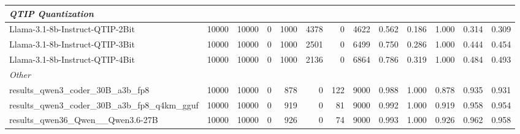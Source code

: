 \begin{table}[htbp]
{\begin{tabular}{lrrrrrrrrrrrr}
    \midrule
    \multicolumn{13}{l}{\textit{QTIP Quantization}} \\
    \midrule
    Llama-3.1-8b-Instruct-QTIP-2Bit & 10000 & 10000 & 0 & 1000 & 4378 & 0 & 4622 & 0.562 & 0.186 & 1.000 & 0.314 & 0.309 \\
    Llama-3.1-8b-Instruct-QTIP-3Bit & 10000 & 10000 & 0 & 1000 & 2501 & 0 & 6499 & 0.750 & 0.286 & 1.000 & 0.444 & 0.454 \\
    Llama-3.1-8b-Instruct-QTIP-4Bit & 10000 & 10000 & 0 & 1000 & 2136 & 0 & 6864 & 0.786 & 0.319 & 1.000 & 0.484 & 0.493 \\
    \midrule
    \multicolumn{13}{l}{\textit{Other}} \\
    \midrule
    results\_qwen3\_coder\_30B\_a3b\_fp8 & 10000 & 10000 & 0 & 878 & 0 & 122 & 9000 & 0.988 & 1.000 & 0.878 & 0.935 & 0.931 \\
    results\_qwen3\_coder\_30B\_a3b\_fp8\_q4km\_gguf & 10000 & 10000 & 0 & 919 & 0 & 81 & 9000 & 0.992 & 1.000 & 0.919 & 0.958 & 0.954 \\
    results\_qwen36\_Qwen\_\_Qwen3.6-27B & 10000 & 10000 & 0 & 926 & 0 & 74 & 9000 & 0.993 & 1.000 & 0.926 & 0.962 & 0.958 \\
    \bottomrule
  \end{tabular}
  }
\end{table}


